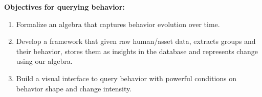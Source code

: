 \documentclass[11pt]{article}
\begin{document}

{\bf Objectives for querying behavior:}
\begin{enumerate}
  \item Formalize an algebra that captures behavior evolution over time.
  \item Develop a framework that given raw human/asset data, extracts groups and their behavior, stores them as insights in the database and represents change using our algebra.
  \item Build a visual interface to query behavior with powerful conditions on behavior shape and change intensity.
\end{enumerate}
\end{document}
